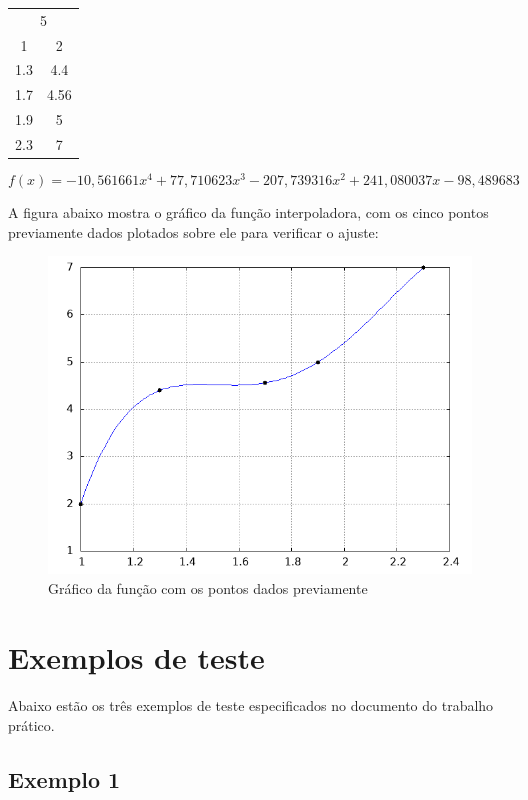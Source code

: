 \documentclass{article}
\begin{document}
\begin{table}[ht!]
\centering
\begin{tabular}{cc}
\multicolumn{2}{c}{5} \\
1   & 2 \\
1.3 & 4.4 \\
1.7 & 4.56 \\
1.9 & 5 \\
2.3 & 7 \\
\end{tabular}
\end{table}

\begin{equation*}
f(x) = -10{,}561661x^4 + 77{,}710623x^3 - 207{,}739316x^2 + 241{,}080037x - 98{,}489683
\end{equation*}

A figura abaixo mostra o gráfico da função interpoladora, com os cinco pontos previamente dados plotados sobre ele para verificar o ajuste:

\begin{figure}[H]
    \centering
    \includegraphics[width=0.5\linewidth]{saida.png}
    \caption{Gráfico da função com os pontos dados previamente}
    \label{fig:saida}
\end{figure}

\section{Exemplos de teste}
\paragraph{} Abaixo estão os três exemplos de teste especificados no documento do trabalho prático.

    \subsection{Exemplo 1}  
\end{document}
